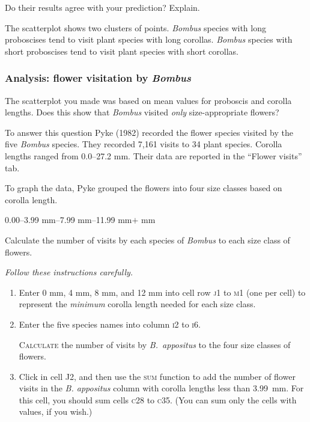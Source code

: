 \documentclass[12pt, hidelinks]{exam}
\newcommand*\AnswerBox[2]{%
    \parbox[t][#1]{0.92\textwidth}{%
    \begin{solution}#2\end{solution}}
    \vspace{\stretch{1}}
}
\begin{document}
\begin{questions}

\question
Do their results agree with your prediction? Explain.

\AnswerBox{0.2\textheight}{The scatterplot shows two clusters of points. 
\textit{Bombus} species with long proboscises tend to visit plant species with 
long corollas. \textit{Bombus} species with short proboscises tend to visit plant species with short corollas.}


\subsubsection*{Analysis: flower visitation by \textit{Bombus}}

The scatterplot you made was based on mean values for proboscis and corolla 
lengths. Does this show that \textit{Bombus} visited \emph{only} size-appropriate flowers?  

To answer this question Pyke (1982) recorded the flower species visited by the five \textit{Bombus} species. They recorded 7,161 visits to 34 plant species. Corolla lengths ranged from 0.0–27.2 mm. Their data are reported in the “Flower visits” tab.

To graph the data, Pyke grouped the flowers into four size classes based on corolla length. %

0.00–3.99 mm–7.99 mm–11.99 mm$+$ mm

\question
Calculate the number of visits by each species of \textit{Bombus} to each size class of flowers. %

\emph{Follow these instructions carefully.}

\begin{enumerate}
	\item Enter 0 mm, 4 mm, 8 mm, and 12 mm into cell row \textsc{j}1 to \textsc{m}1 (one per cell)
	to represent the \emph{minimum} corolla length needed for each size class.
	
	\item Enter the five species names into column \textsc{i}2 to \textsc{i}6.
	
	\textsc{Calculate} the number of visits by \textit{B.~appositus} to the four
	size classes of flowers. 
	
	\item Click in cell J2, and then use the \textsc{sum} function to add the
	number of flower visits in the \textit{B. appositus} column with corolla
	lengths less than 3.99~mm. For this cell, you should sum cells \textsc{c}28 to \textsc{c}35. 
	(You can sum only the cells with values, if you wish.)
	

\end{enumerate}
\end{questions}
\end{document}
